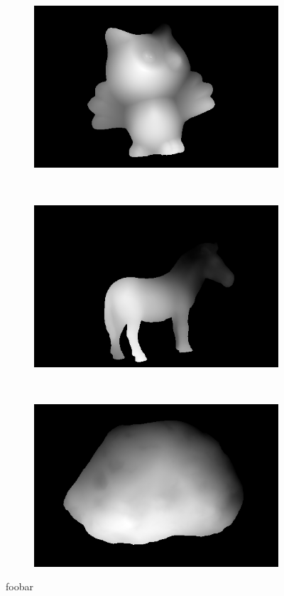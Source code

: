 \documentclass{paper}
\begin{document}
\begin{figure}[h!]
     \begin{subfigure}{0.3\textwidth}
        \includegraphics[width=\textwidth]{results/owl/owl_depthmap}
    \end{subfigure}
    ~
    \begin{subfigure}{0.3\textwidth}
        \includegraphics[width=\textwidth]{results/horse/horse_depthmap}
    \end{subfigure}
    ~
    \begin{subfigure}{0.3\textwidth}
        \includegraphics[width=\textwidth]{results/rock/rock_depthmap}
    \end{subfigure}
    \caption{foobar}
    \label{fig:depthmap}       
\end{figure}




 
\end{document}
